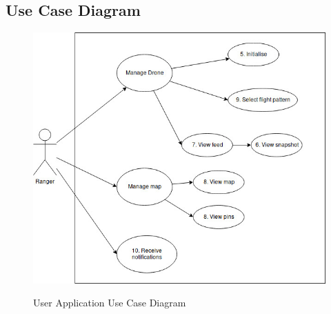 \subsection{Use Case Diagram}
	\begin{center}
		\begin{figure}[h!]
			\centering
			\includegraphics[scale=0.45]{./assets/images/application-ucd.jpg}
			\label{fig: user-application-ucd }
			\caption{User Application Use Case Diagram}
		\end{figure}
	\end{center}
